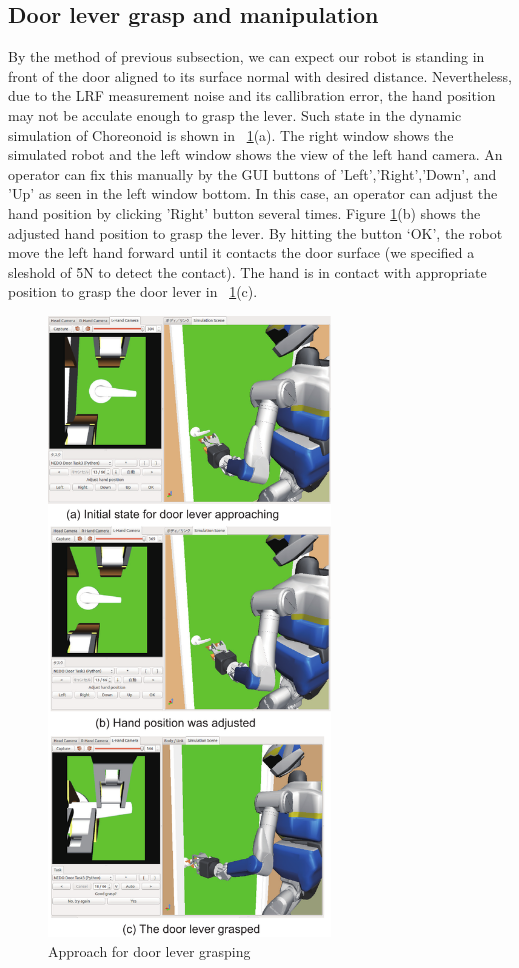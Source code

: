 \subsection{Door lever grasp and manipulation}
%
By the method of previous subsection, we can expect 
our robot is standing in front of the door aligned to its surface normal with desired
distance. 
Nevertheless, due to the LRF measurement noise and its callibration error,
the hand position may not be acculate enough to grasp the lever. Such state in the dynamic simulation 
of Choreonoid is shown in \figurename~\ref{fig:door_lever_grasp}(a). 
The right window shows the simulated robot and the left 
window shows the view of the left hand camera. An operator can fix this manually by the GUI buttons of 
'Left','Right','Down', and 'Up' as seen in the left window bottom. In this case, an operator
can adjust the hand position by clicking 'Right' button several times.
Figure \ref{fig:door_lever_grasp}(b) shows the adjusted hand position to grasp the lever.
By hitting the button `OK', the robot move the left hand forward until it contacts the door surface (we specified a sleshold of 5N to detect the contact).  The hand is in contact with appropriate position to grasp the door lever in \figurename~\ref{fig:door_lever_grasp}(c).
   

\begin{figure}[t]
  \centering
  \includegraphics[width = 7.5cm]{img/approach_door_lever}
  \caption{Approach for door lever grasping}
  \label{fig:door_lever_grasp}
\end{figure}

